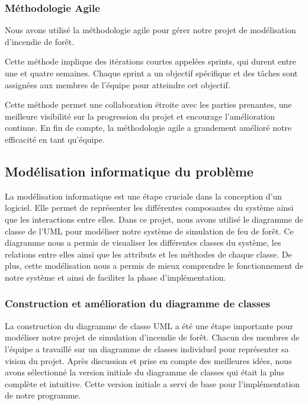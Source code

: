 
\subsubsection{Méthodologie Agile}

Nous avons utilisé la méthodologie agile pour gérer notre projet de modélisation d'incendie de forêt. 

Cette méthode implique des itérations courtes appelées sprints, qui durent entre une et quatre semaines. Chaque sprint a un objectif spécifique et des tâches sont assignées aux membres de l'équipe pour atteindre cet objectif.

Cette méthode permet une collaboration étroite avec les parties prenantes, une meilleure visibilité sur la progression du projet et encourage l'amélioration continue. En fin de compte, la méthodologie agile a grandement amélioré notre efficacité en tant qu'équipe.

\subsection{Modélisation informatique du problème}

La modélisation informatique est une étape cruciale dans la conception d'un logiciel. Elle permet de représenter les différentes composantes du système ainsi que les interactions entre elles. Dans ce projet, nous avons utilisé le diagramme de classe de l'UML pour modéliser notre système de simulation de feu de forêt. Ce diagramme nous a permis de visualiser les différentes classes du système, les relations entre elles ainsi que les attributs et les méthodes de chaque classe. De plus, cette modélisation nous a permis de mieux comprendre le fonctionnement de notre système et ainsi de faciliter la phase d'implémentation.

\subsubsection{Construction et amélioration du diagramme de classes}

La construction du diagramme de classe UML a été une étape importante pour modéliser notre projet de simulation d'incendie de forêt. Chacun des membres de l'équipe a travaillé sur un diagramme de classes individuel pour représenter sa vision du projet. Après discussion et prise en compte des meilleures idées, nous avons sélectionné la version initiale du diagramme de classes qui était la plus complète et intuitive. Cette version initiale a servi de base pour l'implémentation de notre programme.


